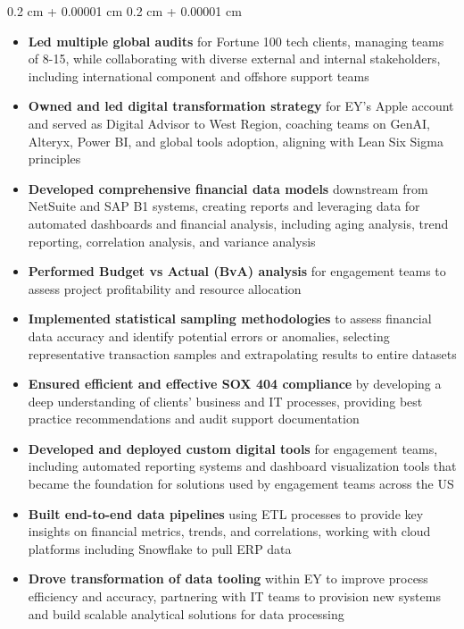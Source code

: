 \documentclass[10pt, letterpaper]{article}
\newenvironment{highlights}{
    \begin{itemize}[
        topsep=0.10 cm,
        parsep=0.10 cm,
        partopsep=0pt,
        itemsep=0pt,
        leftmargin=0.4 cm + 10pt
    ]
}{
    \end{itemize}
} %
\newenvironment{onecolentry}{
    \begin{adjustwidth}{
        0.2 cm + 0.00001 cm
    }{
        0.2 cm + 0.00001 cm
    }
}{
    \end{adjustwidth}
} %
\begin{document}
        \begin{onecolentry}
            \begin{highlights}
                \item \textbf{Led multiple global audits} for Fortune 100 tech clients, managing teams of 8-15, while collaborating with diverse external and internal stakeholders, including international component and offshore support teams
                \item \textbf{Owned and led digital transformation strategy} for EY's Apple account and served as Digital Advisor to West Region, coaching teams on GenAI, Alteryx, Power BI, and global tools adoption, aligning with Lean Six Sigma principles
                \item \textbf{Developed comprehensive financial data models} downstream from NetSuite and SAP B1 systems, creating reports and leveraging data for automated dashboards and financial analysis, including aging analysis, trend reporting, correlation analysis, and variance analysis
                \item \textbf{Performed Budget vs Actual (BvA) analysis} for engagement teams to assess project profitability and resource allocation
                \item \textbf{Implemented statistical sampling methodologies} to assess financial data accuracy and identify potential errors or anomalies, selecting representative transaction samples and extrapolating results to entire datasets
                \item \textbf{Ensured efficient and effective SOX 404 compliance} by developing a deep understanding of clients' business and IT processes, providing best practice recommendations and audit support documentation
                \item \textbf{Developed and deployed custom digital tools} for engagement teams, including automated reporting systems and dashboard visualization tools that became the foundation for solutions used by engagement teams across the US
                \item \textbf{Built end-to-end data pipelines} using ETL processes to provide key insights on financial metrics, trends, and correlations, working with cloud platforms including Snowflake to pull ERP data
                \item \textbf{Drove transformation of data tooling} within EY to improve process efficiency and accuracy, partnering with IT teams to provision new systems and build scalable analytical solutions for data processing

\end{highlights}
\end{onecolentry}
\end{document}
